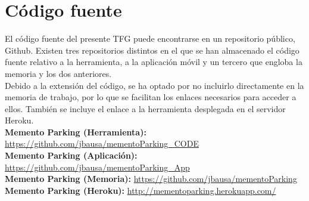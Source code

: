 \chapter{Código fuente}
\label{chap:source}

El código fuente del presente \ac{TFG} puede encontrarse en un repositorio público, Github. Existen tres repositorios distintos en el que se han almacenado el código fuente relativo a la herramienta, a la aplicación móvil y un tercero que engloba la memoria y los dos anteriores.\\
Debido a la extensión del código, se ha optado por no incluirlo directamente en la memoria de trabajo, por lo que se facilitan los enlaces necesarios para acceder a ellos.
También se incluye el enlace a la herramienta desplegada en el servidor Heroku.\\

	 \textbf{Memento Parking (Herramienta): }\url{https://github.com/jbausa/mementoParking_CODE}\\
	 
	 \textbf{Memento Parking (Aplicación): }\url{https://github.com/jbausa/mementoParking_App}\\
	 
	 \textbf{Memento Parking (Memoria): }\url{https://github.com/jbausa/mementoParking}\\
	 
	 \textbf{Memento Parking (Heroku): }\url{http://mementoparking.herokuapp.com/}

